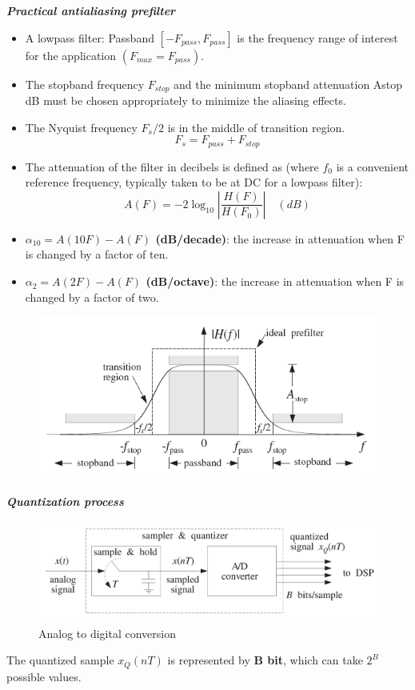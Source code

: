 \documentclass[11pt, a4paper]{article}
\begin{document}
\textit{\textbf{Practical antialiasing prefilter}} 
\begin{itemize}
    \item A lowpass filter: Passband $[-F_{pass}, F_{pass}]$ is the frequency range of interest for the application $(F_{max}=F_{pass})$.
    \item The stopband frequency $F_{stop}$ and the minimum stopband attenuation Astop dB must be chosen appropriately to minimize the aliasing effects.
    \item The Nyquist frequency $F_s/2$ is in the middle of transition region.
    \begin{equation*}
        F_s = F_{pass}+F_{stop}
    \end{equation*}
    \item The attenuation of the filter in decibels is defined as (where $f_0$ is a convenient reference frequency, typically taken to be at DC for a lowpass filter):
    \begin{equation*}
        A(F) = -2\log_{10}\left|\dfrac{H(F)}{H(F_0)} \right| \quad (dB)
    \end{equation*}
    \item \textbf{$\alpha_{10} =A(10F)-A(F)$ (dB/decade)}: the increase in attenuation when F is changed by a factor of ten.
    \item \textbf{$\alpha_2 =A(2F)-A(F)$ (dB/octave)}: the increase in attenuation when F is changed by a factor of two.
\end{itemize}
\begin{figure}[h!]
    \centering
    \includegraphics[width=0.5\linewidth]{img/11.png}
\end{figure}

\textit{\textbf{Quantization process}}
\begin{figure}[h!]
    \centering
    \includegraphics[width=0.5\linewidth]{img/17.png}
    \caption{Analog to digital conversion}
\end{figure}
The quantized sample $x_Q(nT)$ is represented by \textbf{B bit}, which can take $2^B$ possible values. 
\end{document}
